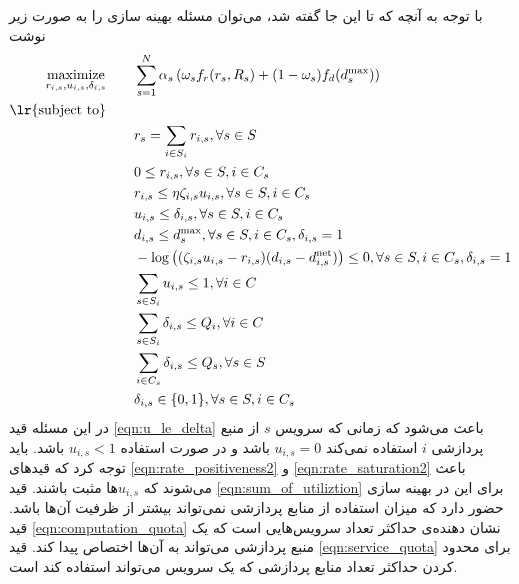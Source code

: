     با توجه به آنچه که تا این جا گفته شد،‌ می‌توان مسئله بهینه سازی را به صورت زیر نوشت
    \begin{subequations}\label{eqn:optimization2}
      \begin{align}
        \underset{r_{i,s}, u_{i,s}, \delta_{i,s}}{\text{maximize}} \qquad & \sum_{s=1}^N \alpha_s \left (\omega_s f_r(r_s, R_s) + (1-\omega_s) f_d(d_s^\text{max}) \right ) \\
        \text{\lr{subject  to}} \qquad & \nonumber \\
        & r_s = \sum_{i \in S_i} r_{i,s}, \forall s \in S \\
        & 0 \le r_{i,s}, \forall s \in S, i \in C_s \label{eqn:rate_positiveness2} \\
        & r_{i,s} \le \eta \zeta_{i,s} u_{i,s}, \forall s \in S, i \in C_s \label{eqn:rate_saturation2} \\
        & u_{i,s} \le \delta_{i,s}, \forall s \in S, i \in C_s \label{eqn:u_le_delta} \\
        & d_{i,s} \le d_s^\text{max}, \forall s \in S, i \in C_s, \delta_{i,s}=1 \\
        &- \log \left((\zeta_{i,s} u_{i,s} - r_{i,s}) (d_{i,s} - d_{i,s}^\text{net}) \right ) \le 0, \forall s \in S, i\in C_s, \delta_{i,s}=1 \\
        & \sum_{s \in S_i} u_{i,s} \le 1, \forall i \in C \label{eqn:sum_of_utiliztion} \\
        & \sum_{s \in S_i} \delta_{i,s} \le Q_i, \forall i \in C \label{eqn:computation_quota} \\
        & \sum_{i \in C_s} \delta_{i,s} \le Q_s, \forall s \in S \label{eqn:service_quota} \\
        & \delta_{i,s} \in \{0, 1\}, \forall s \in S, i \in C_s
      \end{align}
    \end{subequations}
    در این مسئله
    قید \eqref{eqn:u_le_delta} باعث می‌شود که زمانی که سرویس $s$ از منبع پردازشی $i$ استفاده نمی‌کند $u_{i,s}=0$ باشد و در صورت استفاده $u_{i,s}<1$ باشد.
    باید توجه کرد که قیدهای \cref{eqn:rate_positiveness2} و \cref{eqn:rate_saturation2} باعث می‌شوند که $u_{i,s}$ها مثبت باشند.
    قید \eqref{eqn:sum_of_utiliztion} برای این در بهینه سازی حضور دارد که میزان استفاده از منابع پردازشی نمی‌تواند بیشتر از ظرفیت آن‌ها باشد.
    قید \eqref{eqn:computation_quota} نشان دهنده‌ی حداکثر تعداد سرویس‌هایی است که یک منبع پردازشی می‌تواند به آن‌ها اختصاص پیدا کند.
    قید \eqref{eqn:service_quota} برای محدود کردن حداکثر تعداد منابع پردازشی که یک سرویس می‌تواند استفاده کند است.
    
